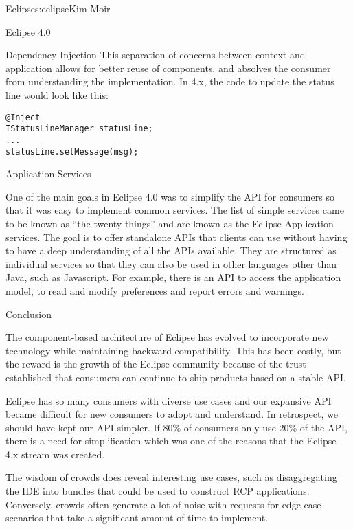 \begin{aosachapter}{Eclipse}{s:eclipse}{Kim Moir}
\begin{aosasect1}{Eclipse 4.0}
\begin{aosasect2}{Dependency Injection}
This separation of concerns between context and application allows for
better reuse of components, and absolves the consumer from
understanding the implementation.  In 4.x, the code to update the
status line would look like this:

\begin{verbatim}
@Inject
IStatusLineManager statusLine;
...
statusLine.setMessage(msg);
\end{verbatim}

\end{aosasect2}

\begin{aosasect2}{Application Services}

One of the main goals in Eclipse 4.0 was to simplify the API for
consumers so that it was easy to implement common services. The list
of simple services came to be known as ``the twenty things'' and are
known as the Eclipse Application services. The goal is to offer
standalone APIs that clients can use without having to have a deep
understanding of all the APIs available. They are structured as
individual services so that they can also be used in other languages
other than Java, such as Javascript.  For example, there is an API to
access the application model, to read and modify preferences and
report errors and warnings.

\end{aosasect2}

\end{aosasect1}

\begin{aosasect1}{Conclusion}

The component-based architecture of Eclipse has evolved to incorporate
new technology while maintaining backward compatibility.  This has
been costly, but the reward is the growth of the Eclipse community
because of the trust established that consumers can continue to ship
products based on a stable API.

Eclipse has so many consumers with diverse use cases and our expansive
API became difficult for new consumers to adopt and understand. In
retrospect, we should have kept our API simpler. If 80\% of consumers
only use 20\% of the API, there is a need for simplification which was
one of the reasons that the Eclipse 4.x stream was created.

The wisdom of crowds does reveal interesting use cases, such as
disaggregating the IDE into bundles that could be used to construct
RCP applications.  Conversely, crowds often generate a lot of noise
with requests for edge case scenarios that take a significant amount
of time to implement.


\end{aosasect1}
\end{aosachapter}
